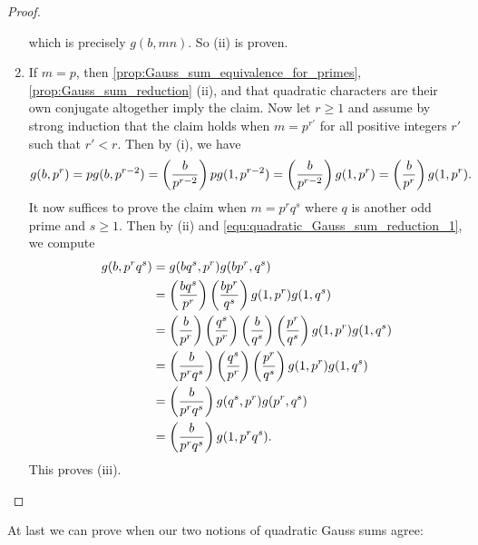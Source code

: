 \begin{proof}
\begin{enumerate}[label=(\roman*)]
              which is precisely $g(b,mn)$. So (ii) is proven.
            \item If $m = p$, then \cref{prop:Gauss_sum_equivalence_for_primes}, \cref{prop:Gauss_sum_reduction} (ii), and that quadratic characters are their own conjugate altogether imply the claim. Now let $r \ge 1$ and assume by strong induction that the claim holds when $m = p^{r'}$ for all positive integers $r'$ such that $r' < r$. Then by (i), we have
            \begin{equation}\label{equ:quadratic_Gauss_sum_reduction_1}
              g(b,p^{r}) = pg(b,p^{r-2}) = \left(\frac{b}{p^{r-2}}\right)pg(1,p^{r-2}) = \left(\frac{b}{p^{r-2}}\right)g(1,p^{r}) = \left(\frac{b}{p^{r}}\right)g(1,p^{r}).
            \end{equation}
            It now suffices to prove the claim when $m = p^{r}q^{s}$ where $q$ is another odd prime and $s \ge 1$. Then by (ii) and \cref{equ:quadratic_Gauss_sum_reduction_1}, we compute
            \begin{align*}
              g(b,p^{r}q^{s}) &= g(bq^{s},p^{r})g(bp^{r},q^{s}) \\
              &= \left(\frac{bq^{s}}{p^{r}}\right)\left(\frac{bp^{r}}{q^{s}}\right)g(1,p^{r})g(1,q^{s}) \\
              &= \left(\frac{b}{p^{r}}\right)\left(\frac{q^{s}}{p^{r}}\right)\left(\frac{b}{q^{s}}\right)\left(\frac{p^{r}}{q^{s}}\right)g(1,p^{r})g(1,q^{s}) \\
              &= \left(\frac{b}{p^{r}q^{s}}\right)\left(\frac{q^{s}}{p^{r}}\right)\left(\frac{p^{r}}{q^{s}}\right)g(1,p^{r})g(1,q^{s}) \\
              &= \left(\frac{b}{p^{r}q^{s}}\right)g(q^{s},p^{r})g(p^{r},q^{s}) \\
              &= \left(\frac{b}{p^{r}q^{s}}\right)g(1,p^{r}q^{s}).
            \end{align*}
            This proves (iii).
          \end{enumerate}
        \end{proof}

        At last we can prove when our two notions of quadratic Gauss sums agree:

